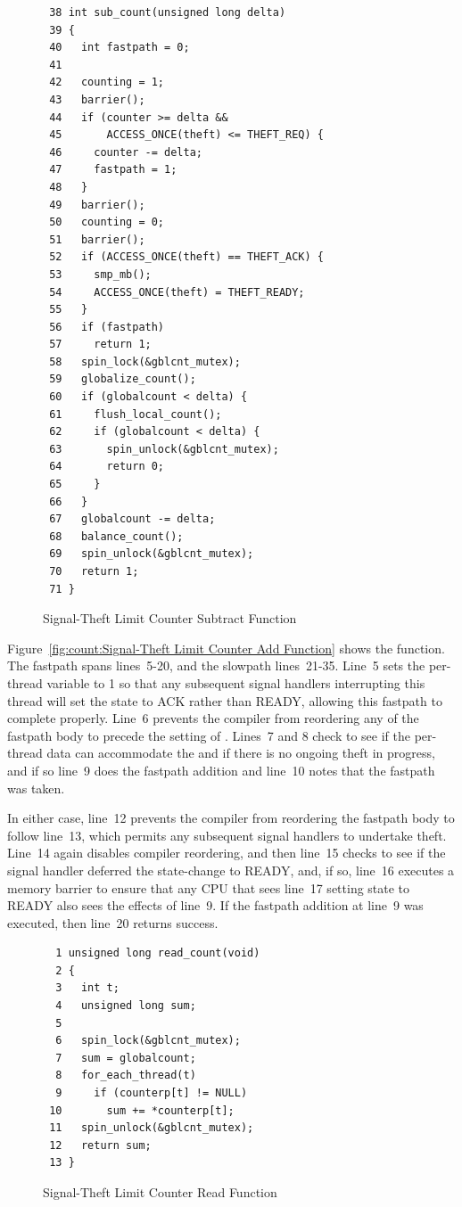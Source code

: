 \begin{figure}[tbp]
{ \scriptsize
\begin{verbatim}
 38 int sub_count(unsigned long delta)
 39 {
 40   int fastpath = 0;
 41 
 42   counting = 1;
 43   barrier();
 44   if (counter >= delta &&
 45       ACCESS_ONCE(theft) <= THEFT_REQ) {
 46     counter -= delta;
 47     fastpath = 1;
 48   }
 49   barrier();
 50   counting = 0;
 51   barrier();
 52   if (ACCESS_ONCE(theft) == THEFT_ACK) {
 53     smp_mb();
 54     ACCESS_ONCE(theft) = THEFT_READY;
 55   }
 56   if (fastpath)
 57     return 1;
 58   spin_lock(&gblcnt_mutex);
 59   globalize_count();
 60   if (globalcount < delta) {
 61     flush_local_count();
 62     if (globalcount < delta) {
 63       spin_unlock(&gblcnt_mutex);
 64       return 0;
 65     }
 66   }
 67   globalcount -= delta;
 68   balance_count();
 69   spin_unlock(&gblcnt_mutex);
 70   return 1;
 71 }
\end{verbatim}
}
\caption{Signal-Theft Limit Counter Subtract Function}
\label{fig:count:Signal-Theft Limit Counter Subtract Function}
\end{figure}

Figure~\ref{fig:count:Signal-Theft Limit Counter Add Function}
shows the  function.
The fastpath spans lines~5-20, and the slowpath lines~21-35.
Line~5 sets the per-thread  variable to 1 so that
any subsequent signal handlers interrupting this thread will
set the  state to ACK rather than READY, allowing this
fastpath to complete properly.
Line~6 prevents the compiler from reordering any of the fastpath body
to precede the setting of .
Lines~7 and 8 check to see if the per-thread data can accommodate
the  and if there is no ongoing theft in progress,
and if so line~9 does the fastpath addition and line~10 notes that
the fastpath was taken.

In either case, line~12 prevents the compiler from reordering the
fastpath body to follow line~13, which permits any subsequent signal
handlers to undertake theft.
Line~14 again disables compiler reordering, and then line~15
checks to see if the signal handler deferred the 
state-change to READY, and, if so, line~16 executes a memory
barrier to ensure that any CPU that sees line~17 setting state to
READY also sees the effects of line~9.
If the fastpath addition at line~9 was executed, then line~20 returns
success.

\begin{figure}[tbp]
{ \scriptsize
\begin{verbatim}
  1 unsigned long read_count(void)
  2 {
  3   int t;
  4   unsigned long sum;
  5 
  6   spin_lock(&gblcnt_mutex);
  7   sum = globalcount;
  8   for_each_thread(t)
  9     if (counterp[t] != NULL)
 10       sum += *counterp[t];
 11   spin_unlock(&gblcnt_mutex);
 12   return sum;
 13 }
\end{verbatim}
}
\caption{Signal-Theft Limit Counter Read Function}
\label{fig:count:Signal-Theft Limit Counter Read Function}
\end{figure}

